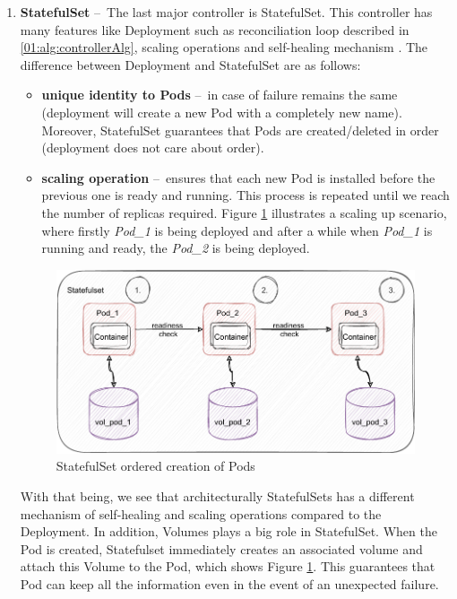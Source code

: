 \begin{enumerate}
    \item \textbf{StatefulSet} \---\ The last major controller is StatefulSet. This controller has many features like Deployment such as reconciliation loop described in \ref{01:alg:controllerAlg}, scaling operations and self-healing mechanism . The difference between Deployment and StatefulSet are as follows:
    \begin{itemize}
        \item \textbf{unique identity to Pods} \---\ in case of failure remains the same (deployment will create a new Pod with a completely new name). Moreover, StatefulSet guarantees that Pods are created/deleted in order (deployment does not care about order).  
        \item \textbf{scaling operation} \---\  ensures that each new Pod is installed before the previous one is ready and running. This process is repeated until we reach the number of replicas required. Figure \ref{02:fig:statefulsetOrderedCreation} illustrates a scaling up scenario, where firstly \emph{Pod\_1} is being deployed and after a while when \emph{Pod\_1} is running and ready, the \emph{Pod\_2} is being deployed.
    \end{itemize}
    
    \begin{figure}[!h]
    \centering
    \includegraphics[scale=1]{obrazky-figures/02-preliminaries/01-kubernetes/04-statefuset_with_volume.pdf}
    \caption{StatefulSet ordered creation of Pods}
    \label{02:fig:statefulsetOrderedCreation}
\end{figure}

    With that being, we see that architecturally StatefulSets has a different mechanism of self-healing and scaling operations compared to the Deployment. In addition, Volumes plays a big role in StatefulSet. When the Pod is created, Statefulset immediately creates an associated volume and attach this Volume to the Pod, which shows Figure \ref{02:fig:statefulsetOrderedCreation}. This guarantees that Pod can keep all the information even in the event of an unexpected failure. 

\end{enumerate}